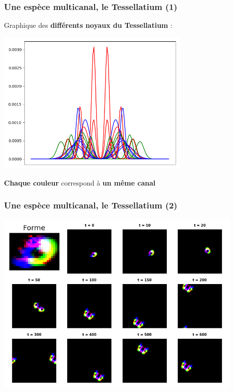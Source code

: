 \documentclass[aspectratio=43]{beamer}
\begin{document}
\begin{frame}
	\frametitle{Une esp\`ece multicanal, le Tessellatium (1)}

	Graphique des \textbf{diff\'erents noyaux du Tessellatium} :
	
	\begin{center}
		\includegraphics[width=0.7\textwidth]{plot_kernel_multi_channel.png}
	\end{center}

	\textbf{Chaque couleur} correspond \`a \textbf{un m\^eme canal}
\end{frame}

\begin{frame}
	\frametitle{Une esp\`ece multicanal, le Tessellatium (2)}

	\centering\includegraphics[width=0.9\textwidth]{evolution_aquarium.png}
\end{frame}
\end{document}
